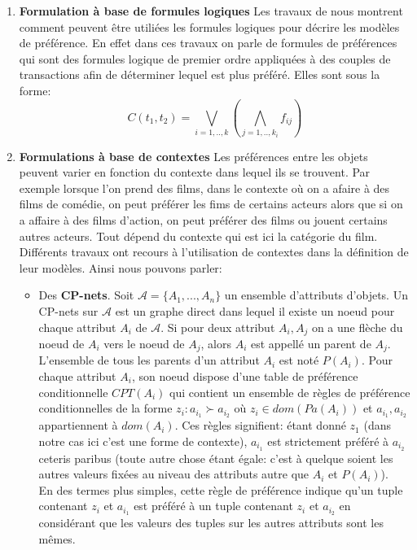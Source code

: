 \documentclass[a4paper,12pt,openany,oneside]{article}
\begin{document}
\begin{enumerate}
\item \textbf{Formulation à base de formules logiques}
Les travaux de \cite{CHO} nous montrent comment peuvent être utiliées les formules logiques pour décrire les modèles de préférence. En effet dans ces travaux on parle de formules de préférences qui sont des formules logique de premier ordre appliquées à des couples de transactions afin de déterminer lequel est plus préféré. Elles sont sous la forme:
\[
	C(t_1,t_2)=\bigvee_{i=1,..,k}(\bigwedge_{j=1,..,k_i}f_{ij})
\]


\item \textbf{Formulations à base de contextes}
Les préférences entre les objets peuvent varier en fonction du contexte dans lequel ils se trouvent. Par exemple lorsque l'on prend des films, dans le contexte où on a afaire à des films de comédie, on peut préférer les fims de certains acteurs  alors que si on a affaire à des films d'action, on peut préférer des films ou jouent certains autres acteurs. Tout dépend du contexte qui est ici la catégorie du film. \\
Différents travaux ont recours à l'utilisation de contextes dans la définition de leur modèles. Ainsi nous pouvons parler:\\
	\begin{itemize}
		\item Des \textbf{CP-nets}. Soit $\mathcal{A}=\{A_1,...,A_n\}$ un ensemble d'attributs d'objets. Un CP-nets sur $\mathcal{A} $ est un graphe direct dans lequel il existe un noeud pour chaque attribut $A_i$ de $\mathcal{A}$. Si pour deux attribut $A_i,A_j$ on a une flèche du noeud de $A_i$ vers le noeud de $A_j$, alors $A_i$ est appellé un parent de $A_j$. L'ensemble de tous les parents d'un attribut $A_i$ est noté $P(A_i)$. Pour chaque attribut $A_i$, son noeud dispose d'une table de préférence conditionnelle $CPT(A_i)$ qui contient un ensemble de règles de préférence conditionnelles de la forme $z_i:a_{i_1}\succ a_{i_2}$ où $z_i\in dom(Pa(A_i))$ et $a_{i_1},a_{i_2}$ appartiennent à $dom(A_i)$. Ces règles signifient: étant donné $z_1$ (dans notre cas ici c'est une forme de contexte), $a_{i_1}$ est strictement préféré à $a_{i_2}$ ceteris paribus (toute autre chose étant égale: c'est à quelque soient les autres valeurs fixées au niveau des attributs autre que $A_i$ et $P(A_i)$).\\
En des termes plus simples, cette règle de préférence indique qu'un tuple contenant $z_i$ et $a_{i_1}$ est préféré à un tuple contenant $z_i$ et $a_{i_2}$ en considérant que les valeurs des tuples sur les autres attributs sont les mêmes.


\end{itemize}
\end{enumerate}
\end{document}
